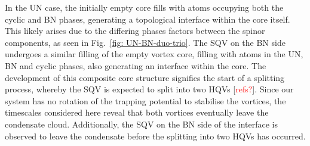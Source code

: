 In the UN case, the initially empty core fills with atoms occupying both the
cyclic and BN phases, generating a topological interface within the core itself.
This likely arises due to the differing phases factors between the spinor
components, as seen in Fig.~\ref{fig: UN-BN-duo-trio}.
The SQV on the BN side undergoes a similar filling of the empty vortex core,
filling with atoms in the UN, BN and cyclic phases, also generating an interface
within the core.
The development of this composite core structure signifies the start of a
splitting process, whereby the SQV is expected to split into two HQVs
[\textcolor{red}{refs?}].
Since our system has no rotation of the trapping potential to stabilise the
vortices, the timescales considered here reveal that both vortices eventually
leave the condensate cloud.
Additionally, the SQV on the BN side of the interface is observed to leave the
condensate before the splitting into two HQVs has occurred.

